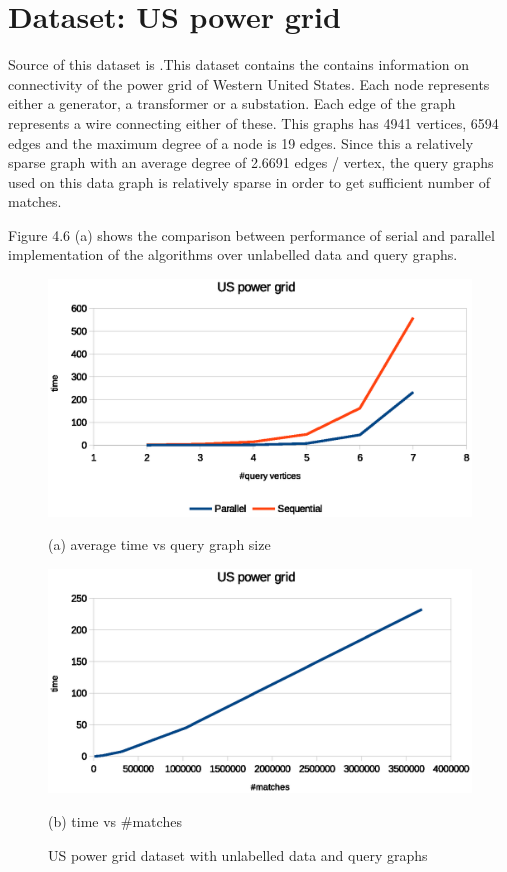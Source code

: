 \section{Dataset: US power grid}

Source of this dataset is \cite{powergrid}.This dataset contains the contains information on connectivity of the power grid of Western United States. Each node represents either a generator, a transformer or a substation. Each edge of the graph represents a wire connecting either of these. This graphs has 4941 vertices, 6594 edges and the maximum degree of a node is 19 edges. Since this a relatively sparse graph with an average degree of 2.6691 edges / vertex, the query graphs used on this data graph is relatively sparse in order to get sufficient number of matches.

Figure 4.6 (a) shows the comparison between performance of serial and parallel implementation of the algorithms over unlabelled data and query graphs.

\begin{figure}[h!]
    \centering
    \begin{minipage}[b]{.45\textwidth}
        \hspace*{-0.5in}
        \includegraphics[scale=0.55]{images/USpower_unlabelled.eps}
        \caption*{(a) average time vs query graph size}        
    \end{minipage} \hfill  
    \begin{minipage}[b]{.45\textwidth}
        \hspace*{-0.2in}
        \includegraphics[scale=0.55]{images/USpower_unlabelled_tpm.eps}
        \caption*{(b) time vs \#matches}       
    \end{minipage}   
\caption{US power grid dataset with unlabelled data and query graphs}
\label{fig:distmx}
\end{figure}

